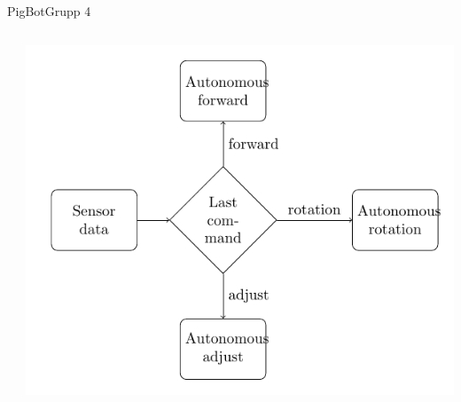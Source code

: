 \begin{frame}{PigBot}{Grupp 4}
\begin{columns}
\begin{column}{0.5\textwidth}
		\end{column}
		\pause
    		\begin{column}{0.5\textwidth}
      			\includegraphics[width=\textwidth]{images/controllerSensorFlow.pdf}
    		\end{column}
  	\end{columns}
	 
\end{frame}

